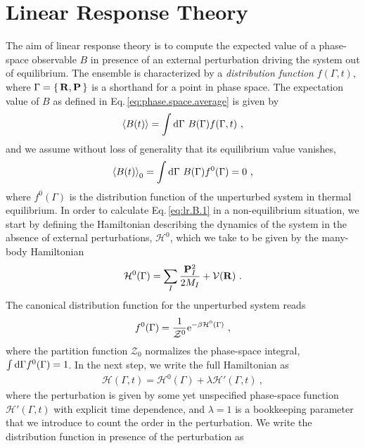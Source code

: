 \section{Linear Response Theory}
The aim of linear response theory is to compute the expected value of a phase-space observable $B$ in presence of an external perturbation driving the system out of equilibrium. The ensemble is characterized by a \emph{distribution function} $f(\Gamma, t)$, where $\Gamma = \set{{\bf R}, {\bf P}}$ is a shorthand for a point in phase space. The expectation value of $B$ as defined in Eq.\,\eqref{eq:phase.space.average} is given by
\begin{align}
  \braket{B (t)}
    = \int \d \Gamma ~ B (\Gamma) f(\Gamma, t)~,
  \label{eq:lr.B.1}
\end{align}
and we assume without loss of generality that its equilibrium value vanishes,
\begin{align}
\braket{B (t)}_{0}
= \int \d \Gamma ~ B (\Gamma) f^0(\Gamma) = 0~,
\label{eq:lr.B0}
\end{align}
where $f^0 (\Gamma)$ is the distribution function of the unperturbed system in thermal equilibrium. In order to calculate Eq.\,\eqref{eq:lr.B.1} in a non-equilibrium situation, we start by defining the Hamiltonian describing the dynamics of the system in the absence of external perturbations, $\mathcal H^0$, which we take to be given by the many-body Hamiltonian
\begin{align}
  \mathcal H^0 (\Gamma) 
    = \sum_I \frac{\b P_I^2}{2 M_I} + \mathcal V (\b R)~.
  \label{eq:lr.H0}
\end{align}
The canonical distribution function for the unperturbed system reads
\begin{align}
f^0 (\Gamma) 
= \frac{1}{\mathcal{Z}^0} {\rm e}^{- \beta \mathcal H^0 (\Gamma)}~,
\label{eq:lr.f0}
\end{align}
where the partition function $\mathcal{Z}_0$ normalizes the phase-space integral, \mbox{$\int {\rm d} \Gamma f^0 (\Gamma) = 1$}.
In the next step, we write the full Hamiltonian as
\begin{align}
  \mathcal H (\Gamma, t)
   = \mathcal H^0 (\Gamma) + \lambda \mathcal H' (\Gamma, t)~,
  \label{eq:lr.H}
\end{align}
where the perturbation is given by some yet unspecified phase-space function $\mathcal H' (\Gamma, t)$ with explicit time dependence, and $\lambda = 1$ is a bookkeeping parameter that we introduce to count the order in the perturbation.
We write the distribution function in presence of the perturbation as
